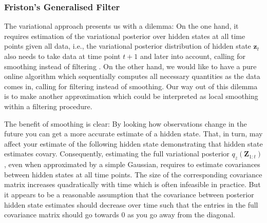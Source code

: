 \documentclass[a4paper,10pt]{article}
\newcommand{\bs}[1]{\mathbf{#1}}					%
\renewcommand{\ss}{z}         %
\newcommand{\ps}{\bs{\ss}}    %
\newcommand{\Ps}{\bs{Z}}    %
\begin{document}
\subsubsection{Friston's Generalised Filter}
The variational approach presents us with a dilemma: On the one hand, it requires estimation of the variational posterior over hidden states at all time points given all data, i.e., the variational posterior distribution of hidden state $\ps_t$ also needs to take data at time point $t+1$ and later into account, calling for smoothing instead of filtering \citep[cf.][]{Beal2003}. On the other hand, we would like to have a pure online algorithm which sequentially computes all necessary quantities as the data comes in, calling for filtering instead of smoothing. Our way out of this dilemma is to make another approximation which could be interpreted as local smoothing within a filtering procedure.

The benefit of smoothing is clear: By looking how observations change in the future you can get a more accurate estimate of a hidden state. That, in turn, may affect your estimate of the following hidden state demonstrating that hidden state estimates covary. Consequently, estimating the full variational posterior $q_{\ss}(\Ps_{1:t})$, even when approximated by a simple Gaussian, requires to estimate covariances between hidden states at all time points. The size of the corresponding covariance matrix increases quadratically with time which is often infeasible in practice. But it appears to be a reasonable assumption that the covariance between posterior hidden state estimates should decrease over time such that the entries in the full covariance matrix should go towards 0 as you go away from the diagonal. 
\end{document}
